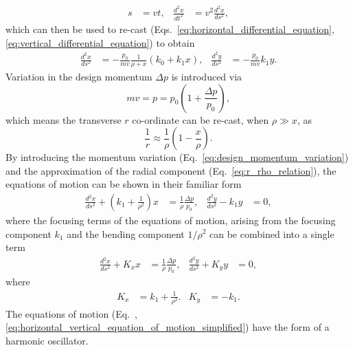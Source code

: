 \documentclass[../main.tex]{subfiles}
\begin{document}
\begin{align}
s&=vt, & \frac{d^{2}x}{dt^{2}} &= v^{2}\frac{d^{2}x}{ds^{2}},
\label{eq:velocity_approximation_replacing_variables}    
\end{align}
which can then be used to re-cast (Eqs.~\ref{eq:horizontal_differential_equation}, \ref{eq:vertical_differential_equation}) to obtain
\begin{align}
\frac{d^{2}x}{ds^{2}} &= -\frac{p_{0}}{mv}\frac{1}{\rho+x}\left(k_{0}+k_{1}x\right), &
\frac{d^{2}y}{ds^{2}} &= -\frac{p_{0}}{mv}k_{1}y.
\label{eq:horizontal_vertical_recast_differential_equation}
\end{align}
Variation in the design momentum $\Delta p$ is introduced via
\begin{equation}
mv = p = p_{0}\left(1+\frac{\Delta p}{p_{0}}\right),
\label{eq:design_momentum_variation}    
\end{equation}
which means the transverse $r$ co-ordinate can be re-cast, when $\rho \gg x$, as
\begin{equation}
\frac{1}{r}\approx \frac{1}{\rho}\left(1-\frac{x}{\rho}\right). 
\label{eq:r_rho_relation}
\end{equation}
By introducing the momentum variation (Eq.~\ref{eq:design_momentum_variation}) and the approximation of the radial component (Eq.~\ref{eq:r_rho_relation}), the equations of motion can be shown in their familiar form \cite{rossbach1993basic,wille2000physics}
\begin{align}
\frac{d^{2}x}{ds^{2}} +\left(k_{1}+\frac{1}{\rho^{2}}\right)x &= \frac{1}{\rho}\frac{\Delta p}{p_{0}}, &
\frac{d^{2}y}{ds^{2}} - k_{1}y &= 0,
\label{eq:horizontal_vertical_equation_of_motion}
\end{align}
where the focusing terms of the equations of motion, arising from the focusing component $k_{1}$ and the bending component $1/\rho^{2}$ can be combined into a single term
\begin{align}
\frac{d^{2}x}{ds^{2}} + K_{x}x &= \frac{1}{\rho}\frac{\Delta p}{p_{0}}, &
\frac{d^{2}y}{ds^{2}} + K_{y}y &= 0,
\label{eq:horizontal_vertical_equation_of_motion_simplified}
\end{align}
where
\begin{align}
K_{x} &= k_{1} + \frac{1}{\rho^{2}}. &
K_{y} &= -k_{1}.
\label{eq:focusing_equation_of_motion}    
\end{align}
The equations of motion (Eq.~, \ref{eq:horizontal_vertical_equation_of_motion_simplified}) have the form of a harmonic oscillator.
\end{document}
